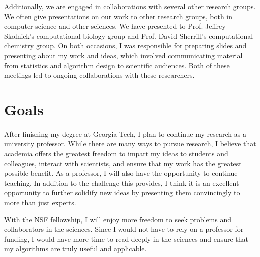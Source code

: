 \documentclass[twoside,leqno, 12pt]{article}
\begin{document}
Additionally, we are engaged in collaborations with several other research groups.  We often give presentations on our work to other research groups, both in computer science and other sciences.  We have presented to Prof. Jeffrey Skolnick's computational biology group and Prof. David Sherrill's computational chemistry group.  On both occasions, I was responsible for preparing slides and presenting about my work and ideas, which involved communicating material from statistics and algorithm design to scientific audiences.  Both of these meetings led to ongoing collaborations with these researchers.








\section{Goals}

After finishing my degree at Georgia Tech, I plan to continue my research as a university professor.  While there are many ways to pursue research, I believe that academia offers the greatest freedom to impart my ideas to students and colleagues, interact with scientists, and ensure that my work has the greatest possible benefit.  As a professor, I will also have the opportunity to continue teaching.  In addition to the challenge this provides, I think it is an excellent opportunity to further solidify new ideas by presenting them convincingly to more than just experts.  

With the NSF fellowship, I will enjoy more freedom to seek problems and collaborators in the sciences.  Since I would not have to rely on a professor for funding, I would have more time to read deeply in the sciences and ensure that my algorithms are truly useful and applicable.  



%	
%	
\end{document}
